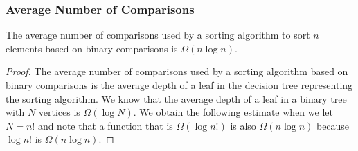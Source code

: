 \documentclass[10pt, compress]{beamer}
\begin{document}
\begin{frame}[fragile]
\frametitle{Average Number of Comparisons}
\begin{theorem}
	The average number of comparisons used by a sorting algorithm to sort $n$ elements based on binary comparisons is $\Omega(n \log n)$.
\end{theorem}
\begin{proof}
	The average number of comparisons used by a sorting algorithm based on binary comparisons is the average depth of a leaf in the decision tree representing the sorting algorithm. We know that the average depth of a leaf in a binary tree with $N$ vertices
	is $\Omega(\log N)$. We obtain the following estimate when we let $N = n!$ and note that a function that is $\Omega(\log n!)$ is also $\Omega(n \log n)$ because $\log n!$ is $\Omega (n \log n)$.
\end{proof}
\end{frame}

\end{document}
